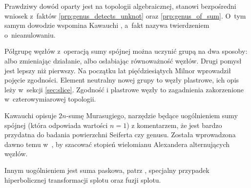 Prawdziwy dowód oparty jest na topologii algebraicznej, stanowi bezpośredni wniosek z~faktów \ref{prp:genus_detects_unknot} oraz \ref{prp:genus_of_sum}.
O~tym samym dowodzie wspomina Kawauchi \cite[s. 33]{kawauchi96}, a~fakt nazywa twierdzeniem o~nieanulowaniu.

Półgrupę węzłów z~operacją sumy spójnej można uczynić grupą na dwa sposoby: albo zmieniając działanie, albo osłabiając równoważność węzłów.
Drugi pomysł jest lepszy niż pierwszy.
Na początku lat pięćdziesiątych Milnor wprowadził pojęcie zgodności.
%
%
Element neutralny nowej grupy to węzły plastrowe, ich opis leży w~sekcji \ref{sec:slice}.
Zgodność i plastrowe węzły to zagadnienia zakorzenione w~czterowymiarowej topologii.

Kawauchi \cite[s. 50-53]{kawauchi96} opisuje $2n$-sumę Murasugiego, narzędzie będące uogólnieniem sumy spójnej (która odpowiada wartości $n = 1$) z komentarzem, że jest bardzo przydatna do badania powierzchni Seiferta czy genusu.
%
Została wprowadzona dawno temu w~\cite{murasugi58}, by szacować stopień wielomianu Alexandera alternujących węzłów.

Innym uogólnieniem jest suma paskowa, patrz \cite[s. 31-32, 43]{kawauchi96}, specjalny przypadek hiperbolicznej transformacji splotu oraz fuzji splotu.

